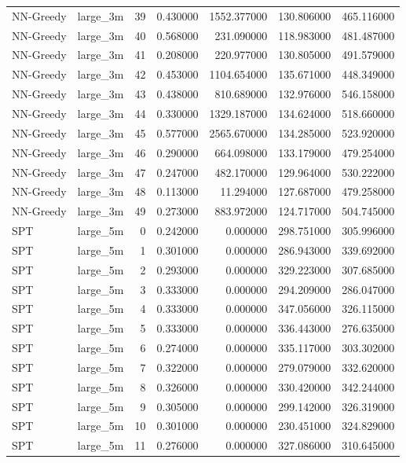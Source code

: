 \begin{tabular}{llrrrrr}
NN-Greedy & large_3m & 39 & 0.430000 & 1552.377000 & 130.806000 & 465.116000 \\
NN-Greedy & large_3m & 40 & 0.568000 & 231.090000 & 118.983000 & 481.487000 \\
NN-Greedy & large_3m & 41 & 0.208000 & 220.977000 & 130.805000 & 491.579000 \\
NN-Greedy & large_3m & 42 & 0.453000 & 1104.654000 & 135.671000 & 448.349000 \\
NN-Greedy & large_3m & 43 & 0.438000 & 810.689000 & 132.976000 & 546.158000 \\
NN-Greedy & large_3m & 44 & 0.330000 & 1329.187000 & 134.624000 & 518.660000 \\
NN-Greedy & large_3m & 45 & 0.577000 & 2565.670000 & 134.285000 & 523.920000 \\
NN-Greedy & large_3m & 46 & 0.290000 & 664.098000 & 133.179000 & 479.254000 \\
NN-Greedy & large_3m & 47 & 0.247000 & 482.170000 & 129.964000 & 530.222000 \\
NN-Greedy & large_3m & 48 & 0.113000 & 11.294000 & 127.687000 & 479.258000 \\
NN-Greedy & large_3m & 49 & 0.273000 & 883.972000 & 124.717000 & 504.745000 \\
SPT & large_5m & 0 & 0.242000 & 0.000000 & 298.751000 & 305.996000 \\
SPT & large_5m & 1 & 0.301000 & 0.000000 & 286.943000 & 339.692000 \\
SPT & large_5m & 2 & 0.293000 & 0.000000 & 329.223000 & 307.685000 \\
SPT & large_5m & 3 & 0.333000 & 0.000000 & 294.209000 & 286.047000 \\
SPT & large_5m & 4 & 0.333000 & 0.000000 & 347.056000 & 326.115000 \\
SPT & large_5m & 5 & 0.333000 & 0.000000 & 336.443000 & 276.635000 \\
SPT & large_5m & 6 & 0.274000 & 0.000000 & 335.117000 & 303.302000 \\
SPT & large_5m & 7 & 0.322000 & 0.000000 & 279.079000 & 332.620000 \\
SPT & large_5m & 8 & 0.326000 & 0.000000 & 330.420000 & 342.244000 \\
SPT & large_5m & 9 & 0.305000 & 0.000000 & 299.142000 & 326.319000 \\
SPT & large_5m & 10 & 0.301000 & 0.000000 & 230.451000 & 324.829000 \\
SPT & large_5m & 11 & 0.276000 & 0.000000 & 327.086000 & 310.645000 \\

\end{tabular}

